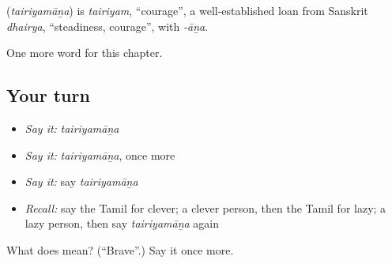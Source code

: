 \begin{cousinweb}
\textbf{} (\emph{tairiyamāṉa}) is \emph{tairiyam}, \textquotedblleft{}courage\textquotedblright{}, a well-established loan from Sanskrit \emph{dhairya}, \textquotedblleft{}steadiness, courage\textquotedblright{}, with \emph{-āṉa}.
\end{cousinweb}

\begin{grammarlens}[title={What you've built}]
One more word for this chapter.
\end{grammarlens}

\subsection*{Your turn}
\begin{itemize}
\raggedright
  \item \emph{Say it:} \emph{tairiyamāṉa}
  \item \emph{Say it:} \emph{tairiyamāṉa}, once more
  \item \emph{Say it:} say \emph{tairiyamāṉa}
  \item \emph{Recall:} say the Tamil for clever; a clever person, then the Tamil for lazy; a lazy person, then say \emph{tairiyamāṉa} again
\end{itemize}

\begin{tcolorbox}[breakable,colback=teal!4,colframe=teal!35!black,title={Before you move on}]
What does  mean? (\textquotedblleft{}Brave\textquotedblright{}.) Say it once more.
\end{tcolorbox}
